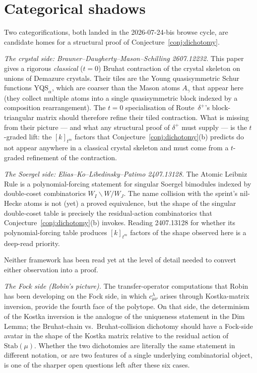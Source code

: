 \documentclass[11pt]{article}
\theoremstyle{definition}
\theoremstyle{remark}
\begin{document}
\section{Categorical shadows}

Two categorifications, both landed in the 2026-07-24-bis browse
cycle, are candidate homes for a structural proof of
Conjecture~\ref{conj:dichotomy}.

\emph{The crystal side: Brauner--Daugherty--Mason--Schilling
2607.12232.} This paper gives a rigorous \emph{classical} ($t=0$)
Bruhat contraction of the crystal skeleton on unions of Demazure
crystals. Their tiles are the Young quasisymmetric Schur functions
$\mathrm{YQS}_\alpha$, which are coarser than the Mason atoms
$A_\gamma$ that appear here (they collect multiple atoms into a
single quasisymmetric block indexed by a composition rearrangement).
The $t = 0$ specialisation of Route~$\delta^+$'s block-triangular
matrix should therefore refine their tiled contraction. What is
missing from their picture --- and what any structural proof of
$\delta^+$ must supply --- is the $t$-graded lift: the
$[k]_{t^m}$ factors that Conjecture~\ref{conj:dichotomy}(b)
predicts do not appear anywhere in a classical crystal skeleton
and must come from a $t$-graded refinement of the contraction.

\emph{The Soergel side: Elias--Ko--Libedinsky--Patimo 2407.13128.}
The Atomic Leibniz Rule is a polynomial-forcing statement for
singular Soergel bimodules indexed by double-coset combinatorics
$W_I \backslash W / W_J$. The name collision with the sprint's
nil-Hecke atoms is not (yet) a proved equivalence, but the shape of
the singular double-coset table is precisely the residual-action
combinatorics that Conjecture~\ref{conj:dichotomy}(b) invokes.
Reading 2407.13128 for whether its polynomial-forcing table produces
$[k]_{t^m}$ factors of the shape observed here is a deep-read
priority.

Neither framework has been read yet at the level of detail needed
to convert either observation into a proof.

\emph{The Fock side (Robin's picture).} The transfer-operator
computations that Robin has been developing on the Fock side, in
which $c^\lambda_{\mu\nu}$ arises through Kostka-matrix inversion,
provide the fourth face of the polytope. On that side, the
determinism of the Kostka inversion is the analogue of the
uniqueness statement in the Dim Lemma; the Bruhat-chain vs.\
Bruhat-collision dichotomy should have a Fock-side avatar in the
shape of the Kostka matrix relative to the residual action of
$\mathrm{Stab}(\mu)$. Whether the two dichotomies are literally
the same statement in different notation, or are two features of
a single underlying combinatorial object, is one of the sharper
open questions left after these six cases.
\end{document}
